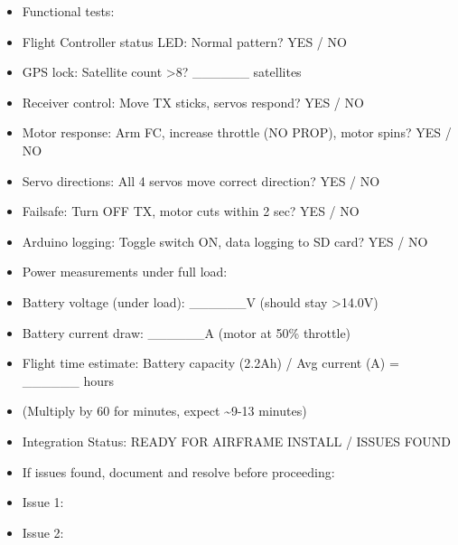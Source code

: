 \documentclass[11pt,letterpaper]{article}
\begin{document}
\begin{itemize}
  \item Functional tests:
  \item Flight Controller status LED: Normal pattern? YES / NO
  \item GPS lock: Satellite count >8? \_\_\_\_\_\_ satellites
  \item Receiver control: Move TX sticks, servos respond? YES / NO
  \item Motor response: Arm FC, increase throttle (NO PROP), motor spins? YES / NO
  \item Servo directions: All 4 servos move correct direction? YES / NO
  \item Failsafe: Turn OFF TX, motor cuts within 2 sec? YES / NO
  \item Arduino logging: Toggle switch ON, data logging to SD card? YES / NO
\end{itemize}

\begin{itemize}
  \item Power measurements under full load:
  \item Battery voltage (under load): \_\_\_\_\_\_V (should stay >14.0V)
  \item Battery current draw: \_\_\_\_\_\_A (motor at 50\% throttle)
  \item Flight time estimate: Battery capacity (2.2Ah) / Avg current (A) = \_\_\_\_\_\_ hours
  \item (Multiply by 60 for minutes, expect \textasciitilde{}9-13 minutes)
\end{itemize}

\begin{itemize}
  \item Integration Status: READY FOR AIRFRAME INSTALL / ISSUES FOUND
\end{itemize}

\begin{itemize}
  \item If issues found, document and resolve before proceeding:
  \item Issue 1: \underline{\hspace{9.45cm}}
  \item Issue 2: \underline{\hspace{9.45cm}}
\end{itemize}
\end{document}

